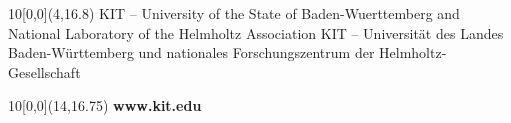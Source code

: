\begin{titlepage}
\begin{textblock}{10}[0,0](4,16.8)
\tiny{
		{KIT -- University of the State of Baden-Wuerttemberg and National Laboratory of the Helmholtz Association}
		{KIT -- Universit\"at des Landes Baden-W\"urttemberg und nationales Forschungszentrum der Helmholtz-Gesellschaft}
}
\end{textblock}

\begin{textblock}{10}[0,0](14,16.75)
\large{
	\textbf{www.kit.edu}
}
\end{textblock}

\end{titlepage}
